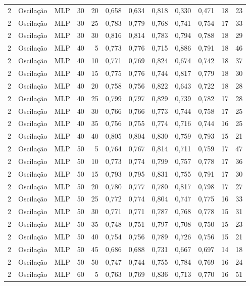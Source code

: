 \begin{longtable}{@{}rllrrrrrrrrr@{}}
2 & Oscilação & MLP & 30 & 20 & 0,658 & 0,634 & 0,818 & 0,330 & 0,471 & 18 & 23 \\
2 & Oscilação & MLP & 30 & 25 & 0,783 & 0,779 & 0,768 & 0,741 & 0,754 & 17 & 33 \\
2 & Oscilação & MLP & 30 & 30 & 0,816 & 0,814 & 0,783 & 0,794 & 0,788 & 18 & 29 \\
2 & Oscilação & MLP & 40 & 5 & 0,773 & 0,776 & 0,715 & 0,886 & 0,791 & 18 & 46 \\
2 & Oscilação & MLP & 40 & 10 & 0,771 & 0,769 & 0,824 & 0,674 & 0,742 & 18 & 37 \\
2 & Oscilação & MLP & 40 & 15 & 0,775 & 0,776 & 0,744 & 0,817 & 0,779 & 18 & 30 \\
2 & Oscilação & MLP & 40 & 20 & 0,758 & 0,756 & 0,822 & 0,643 & 0,722 & 18 & 28 \\
2 & Oscilação & MLP & 40 & 25 & 0,799 & 0,797 & 0,829 & 0,739 & 0,782 & 17 & 28 \\
2 & Oscilação & MLP & 40 & 30 & 0,766 & 0,766 & 0,773 & 0,744 & 0,758 & 17 & 25 \\
2 & Oscilação & MLP & 40 & 35 & 0,756 & 0,755 & 0,774 & 0,716 & 0,744 & 16 & 25 \\
2 & Oscilação & MLP & 40 & 40 & 0,805 & 0,804 & 0,830 & 0,759 & 0,793 & 15 & 21 \\
2 & Oscilação & MLP & 50 & 5 & 0,764 & 0,767 & 0,814 & 0,711 & 0,759 & 17 & 47 \\
2 & Oscilação & MLP & 50 & 10 & 0,773 & 0,774 & 0,799 & 0,757 & 0,778 & 17 & 36 \\
2 & Oscilação & MLP & 50 & 15 & 0,793 & 0,795 & 0,831 & 0,755 & 0,791 & 17 & 30 \\
2 & Oscilação & MLP & 50 & 20 & 0,780 & 0,777 & 0,780 & 0,817 & 0,798 & 17 & 27 \\
2 & Oscilação & MLP & 50 & 25 & 0,772 & 0,774 & 0,804 & 0,747 & 0,775 & 16 & 33 \\
2 & Oscilação & MLP & 50 & 30 & 0,771 & 0,771 & 0,787 & 0,768 & 0,778 & 15 & 31 \\
2 & Oscilação & MLP & 50 & 35 & 0,748 & 0,751 & 0,797 & 0,708 & 0,750 & 15 & 23 \\
2 & Oscilação & MLP & 50 & 40 & 0,754 & 0,756 & 0,789 & 0,726 & 0,756 & 15 & 21 \\
2 & Oscilação & MLP & 50 & 45 & 0,686 & 0,688 & 0,731 & 0,667 & 0,697 & 14 & 18 \\
2 & Oscilação & MLP & 50 & 50 & 0,747 & 0,744 & 0,755 & 0,784 & 0,769 & 16 & 24 \\
2 & Oscilação & MLP & 60 & 5 & 0,763 & 0,769 & 0,836 & 0,713 & 0,770 & 16 & 51 \\

\end{longtable}

